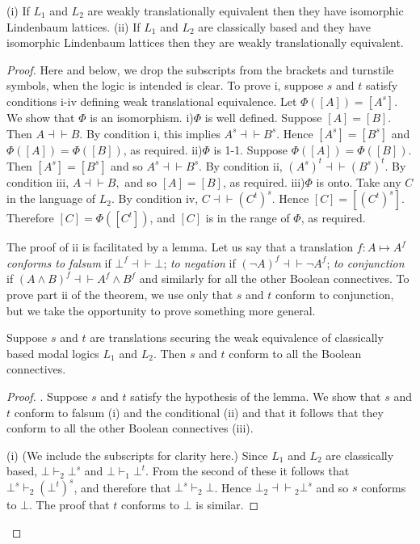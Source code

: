 \begin{theorem}(i) If $L_1$ and $L_2$ are weakly translationally equivalent then they have isomorphic Lindenbaum lattices. (ii) If $L_1$ and $L_2$ are classically based and they have isomorphic Lindenbaum lattices then they are weakly translationally equivalent.
\end{theorem}

\begin{proof}
Here and below, we drop the subscripts from the brackets and turnstile symbols, when the logic is intended is clear. To prove i, suppose $s$ and $t$ satisfy conditions i-iv defining weak translational equivalence. Let $\Phi([A])=[A^s]$. We show that $\Phi$ is an isomorphism.
i)$\Phi$ is well defined. Suppose $[A]=[B]$. Then $A{\dashv}{\vdash}B$. By condition i, this implies $A^s{\dashv}{\vdash}B^s$. Hence $[A^s] = [B^s]$ and $\Phi([A])=\Phi([B])$, as required. 
ii)$\Phi$ is 1-1. Suppose $\Phi([A])=\Phi([B])$. Then $[A^s]=[B^s]$ and so $A^s{\dashv}{\vdash}B^s$. By condition ii, $(A^s)^t{\dashv}{\vdash}(B^s)^t$. By condition iii, $A{\dashv}{\vdash}B,$ and so $[A]=[B]$, as required.
iii)$\Phi$ is onto. Take any $C$ in the language of $L_2$. By condition iv, $C{\dashv}{\vdash}(C^t)^s$. Hence $[C] = [(C^t)^s]$. Therefore $[C]=\Phi([C^t])$, and $[C]$ is in the range of $\Phi$, as required.

The proof of ii is facilitated by a lemma. Let us say that a translation $f\colon A{\mapsto}A^f$ \textit{conforms to falsum} if $\bot^f {\dashv}{\vdash} \bot$; \textit{to negation} if $(\neg A)^f {\dashv}{\vdash} \neg A^f$; \textit{to conjunction} if $(A\wedge B)^f {\dashv}{\vdash}A^f \wedge B^f$ and similarly for all the other Boolean connectives. To prove part ii of the theorem, we use only that $s$ and $t$ conform to conjunction, but we take the opportunity to prove something more general.

\begin{lemma}Suppose $s$ and $t$ are translations securing the weak equivalence of classically based modal logics $L_1$ and $L_2$. Then $s$ and $t$ conform to all the Boolean connectives. 
\end{lemma}
\begin{proof}. Suppose $s$ and $t$ satisfy the hypothesis of the lemma. We show that $s$ and $t$ conform to falsum (i) and the conditional (ii) and that it follows that they conform to all the other Boolean connectives (iii).

(i) (We include the subscripts for clarity here.) Since $L_1$ and $L_2$ are classically based, $\bot\vdash_2 \bot^s$ and $\bot \vdash_1 \bot^t$. From the second of these it follows that $\bot^s \vdash_2 (\bot^t)^s$, and therefore that $\bot^s \vdash_2 \bot$. Hence $\bot_2\!{\dashv}{\vdash}\!_2 \bot^s$ and so $s$ conforms to $\bot$. The proof that $t$ conforms to $\bot$ is similar.


\end{proof}
\end{proof}
